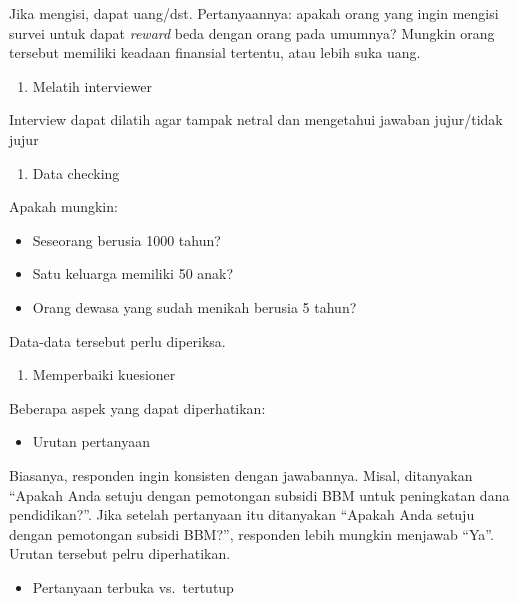 \documentclass[
  letterpaper,
  DIV=11,
  numbers=noendperiod]{scrreprt}
\providecommand{\tightlist}{%
  \setlength{\itemsep}{0pt}\setlength{\parskip}{0pt}}\usepackage{longtable,booktabs,array}
\begin{document}
Jika mengisi, dapat uang/dst. Pertanyaannya: apakah orang yang ingin
mengisi survei untuk dapat \emph{reward} beda dengan orang pada umumnya?
Mungkin orang tersebut memiliki keadaan finansial tertentu, atau lebih
suka uang.

\begin{enumerate}
\def\labelenumi{\arabic{enumi}.}
\setcounter{enumi}{2}
\tightlist
\item
  Melatih interviewer
\end{enumerate}

Interview dapat dilatih agar tampak netral dan mengetahui jawaban
jujur/tidak jujur

\begin{enumerate}
\def\labelenumi{\arabic{enumi}.}
\setcounter{enumi}{3}
\tightlist
\item
  Data checking
\end{enumerate}

Apakah mungkin:

\begin{itemize}
\tightlist
\item
  Seseorang berusia 1000 tahun?
\item
  Satu keluarga memiliki 50 anak?
\item
  Orang dewasa yang sudah menikah berusia 5 tahun?
\end{itemize}

Data-data tersebut perlu diperiksa.

\begin{enumerate}
\def\labelenumi{\arabic{enumi}.}
\setcounter{enumi}{4}
\tightlist
\item
  Memperbaiki kuesioner
\end{enumerate}

Beberapa aspek yang dapat diperhatikan:

\begin{itemize}
\tightlist
\item
  Urutan pertanyaan
\end{itemize}

Biasanya, responden ingin konsisten dengan jawabannya. Misal, ditanyakan
``Apakah Anda setuju dengan pemotongan subsidi BBM untuk peningkatan
dana pendidikan?''. Jika setelah pertanyaan itu ditanyakan ``Apakah Anda
setuju dengan pemotongan subsidi BBM?'', responden lebih mungkin
menjawab ``Ya''. Urutan tersebut pelru diperhatikan.

\begin{itemize}
\tightlist
\item
  Pertanyaan terbuka vs.~tertutup
\end{itemize}
\end{document}
